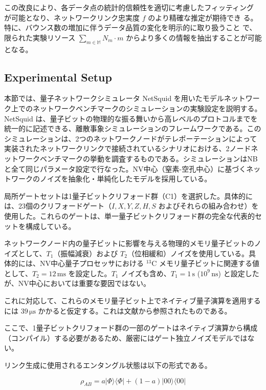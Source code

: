 \documentclass[12pt,a4paper,titlepage,dvipdfmx]{article}
\begin{document}
この改良により、各データ点の統計的信頼性を適切に考慮したフィッティング
が可能となり、ネットワークリンク忠実度 $f$ のより精確な推定が期待でき
る。特に、バウンス数の増加に伴うデータ品質の変化を明示的に取り扱うこと
で、限られた実験リソース $\sum_{m \in \mathbb{M}} N_m \cdot m$
からより多くの情報を抽出することが可能となる。


\newpage


\subsection{Experimental Setup}
\label{sec:experimental_setup}

本節では、量子ネットワークシミュレータ NetSquid を用いたモデルネットワーク上でのネットワークベンチマークのシミュレーションの実験設定を説明する。NetSquid は、量子ビットの物理的な振る舞いから高レベルのプロトコルまでを統一的に記述できる、離散事象シミュレーションのフレームワークである。このシミュレーションは、2つのネットワークノードがテレポーテーションによって実装されたネットワークリンクで接続されているシナリオにおける、2ノードネットワークベンチマークの挙動を調査するものである。シミュレーションはNBと全て同じパラメータ設定で行なった。NV中心（窒素-空孔中心）に基づくネットワークのノイズを抽象化・単純化したモデルを採用している。

局所ゲートセットは1量子ビットクリフォード群（C1）を選択した。具体的には、23個のクリフォードゲート（$I, X, Y, Z, H, S$ およびそれらの組み合わせ）を使用した。これらのゲートは、単一量子ビットクリフォード群の完全な代表的セットを構成している。

ネットワークノード内の量子ビットに影響を与える物理的メモリ量子ビットのノイズとして、$T_1$（振幅減衰）および $T_2$（位相緩和）ノイズを使用している。具体的には、NV中心量子プロセッサにおける ${}^{13}\mathrm{C}$ メモリ量子ビットに関連する値として、$T_2 = 12 \, \mathrm{ms}$ を設定した。$T_1$ ノイズも含め、$T_1 = 1 \, \mathrm{s}$ ($10^9 \, \mathrm{ns}$) と設定したが、NV中心においては重要な要因ではない。

これに対応して、これらのメモリ量子ビット上でネイティブ量子演算を適用するには $39 \, \mathrm{\mu s}$ かかると仮定する。これは文献\cite{humphreys2018deterministic}から参照されたものである。

ここで、1量子ビットクリフォード群の一部のゲートはネイティブ演算から構成（コンパイル）する必要があるため、厳密にはゲート独立ノイズモデルではない。

リンク生成に使用されるエンタングル状態は以下の形式である。

\begin{equation}
\rho_{AB} = a|\Phi\rangle\langle\Phi| + (1-a)|00\rangle\langle 00|
\end{equation}
\end{document}
